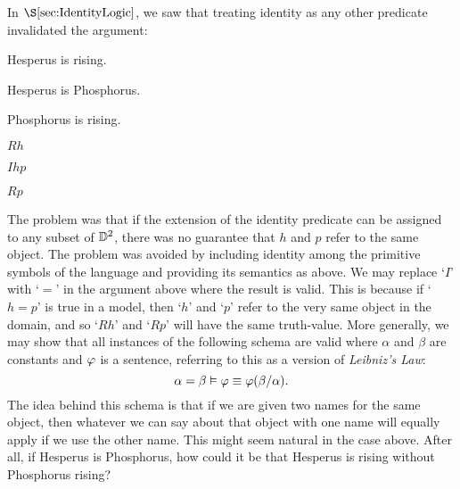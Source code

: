 In $\S\ref{sec:IdentityLogic}$, we saw that treating identity as any other predicate invalidated the argument:

\begin{multicols}{2}
  
\begin{earg}
  \item[] Hesperus is rising.
  \item[] Hesperus is Phosphorus.
  \item[\therefore] Phosphorus is rising.
\end{earg}

\begin{earg}
  \item[] $Rh$
  \item[] $Ihp$
  \item[\therefore] $Rp$
\end{earg}

\end{multicols}

The problem was that if the extension of the identity predicate can be assigned to any subset of $\mathbb{D}^2$, there was no guarantee that $h$ and $p$ refer to the same object.
The problem was avoided by including identity among the primitive symbols of the language and providing its semantics as above.
We may replace `$I$' with `$=$' in the argument above where the result is valid.
This is because if `$h=p$' is true in a model, then `$h$' and `$p$' refer to the very same object in the domain, and so `$Rh$' and `$Rp$' will have the same truth-value.
More generally, we may show that all instances of the following schema are valid where $\alpha$ and $\beta$ are constants and $\varphi$ is a sentence, referring to this as a version of \textit{Leibniz's Law}:
  $$\alpha=\beta \vDash \varphi \equiv \varphi(\beta/\alpha).$$
The idea behind this schema is that if we are given two names for the same object, then whatever we can say about that object with one name will equally apply if we use the other name.
This might seem natural in the case above.
After all, if Hesperus is Phosphorus, how could it be that Hesperus is rising without Phosphorus rising?

